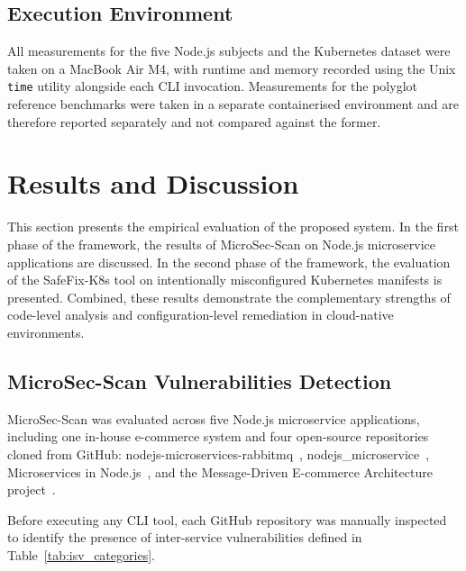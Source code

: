 \documentclass[preprint,12pt]{elsarticle}
\newcommand{\new}[1]{#1}
\begin{document}
\new{\subsection{Execution Environment}}

\new{All measurements for the five Node.js subjects and the Kubernetes
dataset were taken on a MacBook Air M4, with runtime and memory recorded
using the Unix \texttt{time} utility alongside each CLI invocation.
Measurements for the polyglot reference benchmarks were taken in a separate
containerised environment and are therefore reported separately and not
compared against the former.}



\section{Results and Discussion}

This section presents the empirical evaluation of the proposed system.
In the first phase of the framework, the results of MicroSec-Scan on Node.js microservice applications are discussed.
In the second phase of the framework, the evaluation of the SafeFix-K8s tool on intentionally misconfigured Kubernetes manifests is presented. Combined, these results demonstrate the complementary strengths of code-level analysis and configuration-level remediation in cloud-native environments.

\subsection{MicroSec-Scan Vulnerabilities Detection}

MicroSec-Scan was evaluated across five Node.js microservice applications, including one in-house e-commerce system and four open-source repositories cloned from GitHub: nodejs-microservices-rabbitmq~\cite{petrea_nodejs_rabbitmq},
\newline
nodejs\_microservice~\cite{codergogoi_nodejs_microservice}, Microservices in Node.js~\cite{tiwari_microservices_nodejs}, and the Message-Driven E-commerce Architecture project~\cite{ondiek_message_driven_ecommerce}.

Before executing any CLI tool, each GitHub repository was manually inspected to identify the presence of inter-service vulnerabilities defined in Table~\ref{tab:isv_categories}.
\end{document}
